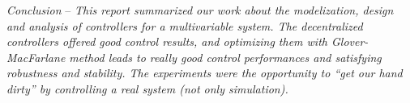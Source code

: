\vspace{.5cm}
\hrulefill
\vspace{.5cm}

\begin{bfseries}
\emph{Conclusion} --
\emph{
    This report summarized our work about the modelization, design and analysis of controllers for a multivariable system.
    The decentralized controllers offered good control results, and optimizing them with Glover-MacFarlane method leads to really good control performances and satisfying robustness and stability.
    The experiments were the opportunity to ``get our hand dirty'' by controlling a real system (not only simulation).
}
\end{bfseries}
